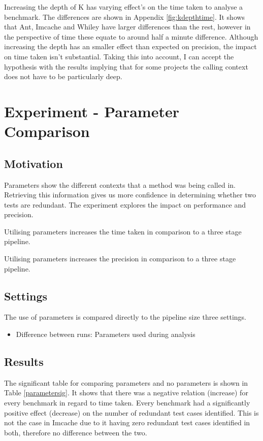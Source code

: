 Increasing the depth of K has varying effect's on the time taken to analyse a benchmark. The differences are shown in Appendix \ref{fig:kdepthtime}. It shows that Ant, Imcache and Whiley have larger differences than the rest, however in the perspective of time these equate to around half a minute difference. Although increasing the depth has an smaller effect than expected on precision, the impact on time taken isn't substantial. Taking this into account, I can accept the hypothesis with the results implying that for some projects the calling context does not have to be particularly deep.

\section{Experiment  - Parameter Comparison}
\label{sec:param}

\subsection{Motivation}
Parameters show the different contexts that a method was being called in. Retrieving this information gives us more confidence in determining whether two tests are redundant. The experiment explores the impact on performance and precision.

\begin{hyp}
Utilising parameters increases the time taken in comparison to a three stage pipeline.
\end{hyp}

\begin{hyp}
Utilising parameters increases the precision in comparison to a three stage pipeline.
\end{hyp}

\subsection{Settings}
The use of parameters is compared directly to the pipeline size three settings.

\begin{itemize}
\item Difference between runs: Parameters used during analysis
\end{itemize}

\subsection{Results}
The significant table for comparing parameters and no parameters is shown in Table \ref{parametersig}. It shows that there was a negative relation (increase) for every benchmark in regard to time taken. Every benchmark had a significantly positive effect (decrease) on the number of redundant test cases identified. This is not the case in Imcache due to it having zero redundant test cases identified in both, therefore no difference between the two.

